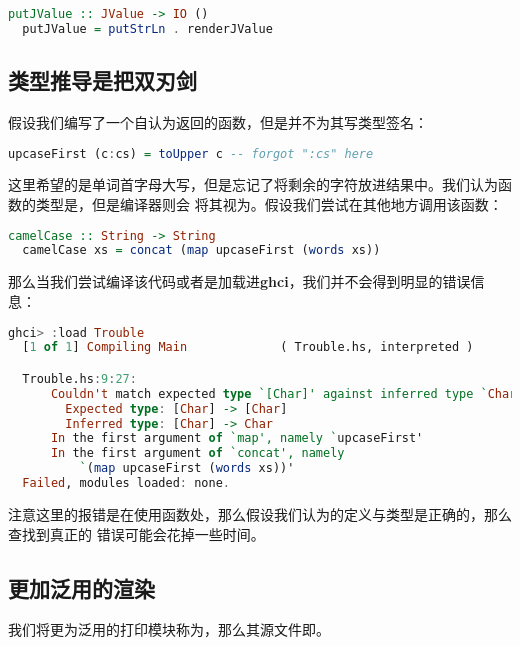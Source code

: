 \documentclass[./main.tex]{subfiles}
\begin{document}
\begin{lstlisting}[language=Haskell]
  putJValue :: JValue -> IO ()
  putJValue = putStrLn . renderJValue
\end{lstlisting}

\subsection*{类型推导是把双刃剑}

假设我们编写了一个自认为返回的函数，但是并不为其写类型签名：

\begin{lstlisting}[language=Haskell]
  upcaseFirst (c:cs) = toUpper c -- forgot ":cs" here
\end{lstlisting}

这里希望的是单词首字母大写，但是忘记了将剩余的字符放进结果中。我们认为函数的类型是，但是编译器则会
将其视为。假设我们尝试在其他地方调用该函数：

\begin{lstlisting}[language=Haskell]
  camelCase :: String -> String
  camelCase xs = concat (map upcaseFirst (words xs))
\end{lstlisting}

那么当我们尝试编译该代码或者是加载进\textbf{ghci}，我们并不会得到明显的错误信息：

\begin{lstlisting}[language=Haskell]
  ghci> :load Trouble
  [1 of 1] Compiling Main             ( Trouble.hs, interpreted )

  Trouble.hs:9:27:
      Couldn't match expected type `[Char]' against inferred type `Char'
        Expected type: [Char] -> [Char]
        Inferred type: [Char] -> Char
      In the first argument of `map', namely `upcaseFirst'
      In the first argument of `concat', namely
          `(map upcaseFirst (words xs))'
  Failed, modules loaded: none.
\end{lstlisting}

注意这里的报错是在使用函数处，那么假设我们认为的定义与类型是正确的，那么查找到真正的
错误可能会花掉一些时间。

\subsection*{更加泛用的渲染}

我们将更为泛用的打印模块称为，那么其源文件即。
\end{document}
